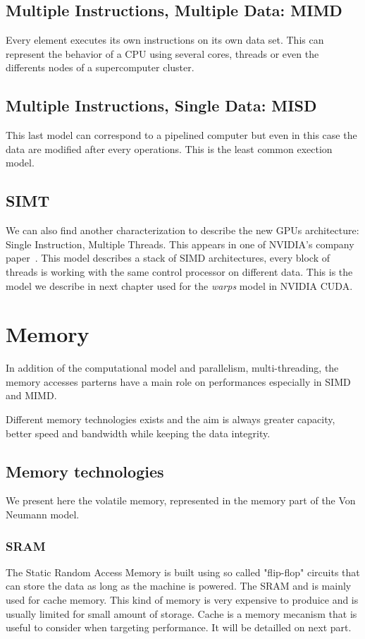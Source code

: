 \subsection{Multiple Instructions, Multiple Data: MIMD}
Every element executes its own instructions on its own data set. 
This can represent the behavior of a CPU using several cores, threads or even the differents nodes of a supercomputer cluster. 

\subsection{Multiple Instructions, Single Data: MISD}
This last model can correspond to a pipelined computer but even in this case the data are modified after every operations.
This is the least common exection model.

\subsection{SIMT}
We can also find another characterization to describe the new GPUs architecture: Single Instruction, Multiple Threads. 
This appears in one of NVIDIA's company paper~\cite{lindholm2008nvidia}. 
This model describes a stack of SIMD architectures, every block of threads is working with the same control processor on different data. 
This is the model we describe in next chapter used for the \textit{warps} model in NVIDIA CUDA.

\section{Memory}
In addition of the computational model and parallelism, multi-threading, the memory accesses parterns have a main role on performances especially in SIMD and MIMD. 

Different memory technologies exists and the aim is always greater capacity, better speed and bandwidth while keeping the data integrity.

\subsection{Memory technologies}
We present here the volatile memory, represented in the memory part of the Von Neumann model. 

\subsubsection{SRAM}
The Static Random Access Memory is built using so called "flip-flop" circuits that can store the data as long as the machine is powered. 
The SRAM and is mainly used for cache memory. 
This kind of memory is very expensive to produice and is usually limited for small amount of storage. 
Cache is a memory mecanism that is useful to consider when targeting performance. 
It will be detailled on next part. 

